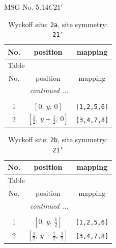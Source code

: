 \documentclass[fleqn,8pt]{jsarticle}
\begin{document}
\setcounter{MaxMatrixCols}{32}

\renewcommand{\tablename}{Table~}
\renewcommand{\figurename}{Figure~}
\begin{center}
\LARGE
MSG No. 5.14\quad$C21'$
\end{center}
\renewcommand{\arraystretch}{1.2}
\begin{longtable}{ccc}
\caption{Wyckoff site: {\tt 2a}, site symmetry: {\tt 21'}}
 \\
 \hline \hline
No. & position & mapping \\ \hline \endfirsthead

\multicolumn{2}{l}{\tablename\ \thetable{}} \\
 \hline \hline
No. & position & mapping \\ \hline \endhead

 \hline \hline
\multicolumn{2}{r}{\footnotesize\it continued ...} \\ \endfoot

 \hline \hline
\multicolumn{2}{r}{} \\ \endlastfoot

1 & $\left[ 0,\, y,\, 0 \right]$ & {\tt [1,2,5,6]} \\ \hline
2 & $\left[ \frac{1}{2},\, y + \frac{1}{2},\, 0 \right]$ & {\tt [3,4,7,8]} \\
\end{longtable}
\renewcommand{\arraystretch}{1.2}
\begin{longtable}{ccc}
\caption{Wyckoff site: {\tt 2b}, site symmetry: {\tt 21'}}
 \\
 \hline \hline
No. & position & mapping \\ \hline \endfirsthead

\multicolumn{2}{l}{\tablename\ \thetable{}} \\
 \hline \hline
No. & position & mapping \\ \hline \endhead

 \hline \hline
\multicolumn{2}{r}{\footnotesize\it continued ...} \\ \endfoot

 \hline \hline
\multicolumn{2}{r}{} \\ \endlastfoot

1 & $\left[ 0,\, y,\, \frac{1}{2} \right]$ & {\tt [1,2,5,6]} \\ \hline
2 & $\left[ \frac{1}{2},\, y + \frac{1}{2},\, \frac{1}{2} \right]$ & {\tt [3,4,7,8]} \\
\end{longtable}
\end{document}
